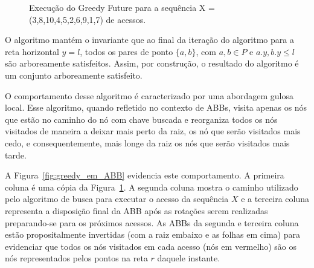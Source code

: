 \begin{figure}
    \caption{Execução do Greedy Future para a sequência X = (3,8,10,4,5,2,6,9,1,7) de acessos.}
\label{fig:GreedyFuture-funcionamento}
\end{figure}

O algoritmo mantém o invariante que ao final da iteração do algoritmo para a reta horizontal $y = l$, todos os pares de ponto $\{a,b\}$, com $a,b \in P$ e $a.y, b.y \leq l$ são arboreamente satisfeitos. Assim, por construção, o resultado do algoritmo é um conjunto arboreamente satisfeito.

O comportamento desse algoritmo é caracterizado por uma abordagem gulosa local. Esse algoritmo, quando refletido no contexto de ABBs, visita apenas os nós que estão no caminho do nó com chave buscada e reorganiza todos os nós visitados de maneira a deixar mais perto da raiz, os nó que serão visitados mais cedo, e consequentemente, mais longe da raiz os nós que serão visitados mais tarde. 

A Figura~\ref{fig:greedy_em_ABB} evidencia este comportamento. A primeira coluna é uma cópia da Figura~\ref{fig:GreedyFuture-funcionamento}. A segunda coluna mostra o caminho utilizado pelo algoritmo de busca para executar o acesso da sequência $X$ e a terceira coluna representa a disposição final da ABB após as rotações serem realizadas preparando-se para os próximos acessos. As ABBs da segunda e terceira coluna estão propositalmente invertidas (com a raiz embaixo e as folhas em cima) para evidenciar que todos os nós visitados em cada acesso (nós em vermelho) são os nós representados pelos pontos na reta $r$ daquele instante.

